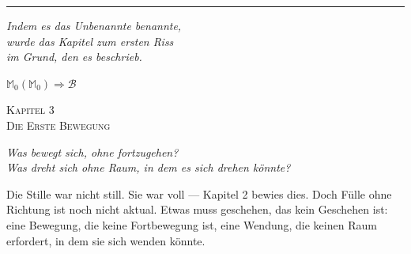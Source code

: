 \documentclass[10pt, openany, oneside]{book}
\renewcommand{\large}{\fontsize{11.5}{14}\selectfont}
\renewcommand{\huge}{\fontsize{17}{21}\selectfont}
\begin{document}
\begin{center}
    \rule{0.15\textwidth}{0.3pt}
\end{center}

\vspace{0.5em}

\begin{center}
    \itshape
    Indem es das Unbenannte benannte,\\
    wurde das Kapitel zum ersten Riss\\
    im Grund, den es beschrieb.
\end{center}

\vspace{0.5em}

\begin{center}
    $\mathbb{M}_0(\mathbb{M}_0) \Rightarrow \mathcal{B}$
\end{center}

%
%
%
%

\newpage

\begin{center}
    {\huge\scshape Kapitel 3}\\[0.3em]
    {\large\scshape Die Erste Bewegung}
\end{center}

\vspace{1.5em}

\begin{center}
    \itshape
    Was bewegt sich, ohne fortzugehen?\\
    Was dreht sich ohne Raum, in dem es sich drehen könnte?
\end{center}

\vspace{2em}


\noindent Die Stille war nicht still. Sie war voll --- Kapitel 2 bewies dies. Doch Fülle ohne Richtung ist noch nicht aktual. Etwas muss geschehen, das kein Geschehen ist: eine Bewegung, die keine Fortbewegung ist, eine Wendung, die keinen Raum erfordert, in dem sie sich wenden könnte.
\end{document}
